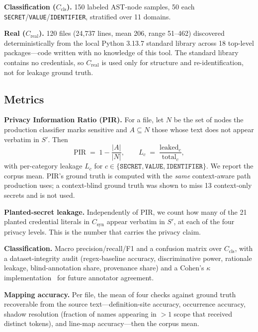 \documentclass[conference]{IEEEtran}
\begin{document}
\textbf{Classification ($C_{\text{cls}}$).} 150 labeled AST-node samples,
50 each \texttt{SECRET}/\texttt{VALUE}/\texttt{IDENTIFIER}, stratified over
11 domains.

\textbf{Real ($C_{\text{real}}$).} 120 files (24{,}737 lines, mean 206,
range 51--462) discovered deterministically from the local Python 3.13.7
standard library across 18 top-level packages---code written with no
knowledge of this tool. The standard library contains no credentials, so
$C_{\text{real}}$ is used only for structure and re-identification, not
for leakage ground truth.

\subsection{Metrics}

\textbf{Privacy Information Ratio (PIR).} For a file, let $N$ be the set of
nodes the production classifier marks sensitive and $A \subseteq N$ those
whose text does not appear verbatim in $S'$. Then
\begin{equation}
\mathrm{PIR} \;=\; 1 - \frac{|A|}{|N|},
\qquad
L_c \;=\; \frac{\text{leaked}_c}{\text{total}_c},
\label{eq:pir}
\end{equation}
with per-category leakage $L_c$ for $c \in \{\texttt{SECRET}, \texttt{VALUE},
\texttt{IDENTIFIER}\}$. We report the corpus mean. PIR's ground truth is
computed with the \emph{same} context-aware path production uses; a
context-blind ground truth was shown to miss 13 context-only secrets and
is not used.

\textbf{Planted-secret leakage.} Independently of PIR, we count how many
of the 21 planted credential literals in $C_{\text{syn}}$ appear verbatim
in $S'$, at each of the four privacy levels. This is the number that
carries the privacy claim.

\textbf{Classification.} Macro precision/recall/F1 and a confusion matrix
over $C_{\text{cls}}$, with a dataset-integrity audit (regex-baseline
accuracy, discriminative power, rationale leakage, blind-annotation share,
provenance share) and a Cohen's $\kappa$ implementation~\cite{cohen1960coefficient}
for future annotator agreement.

\textbf{Mapping accuracy.} Per file, the mean of four checks against
ground truth recoverable from the source text---definition-site accuracy,
occurrence accuracy, shadow resolution (fraction of names appearing in
$>1$ scope that received distinct tokens), and line-map accuracy---then
the corpus mean.
\end{document}
